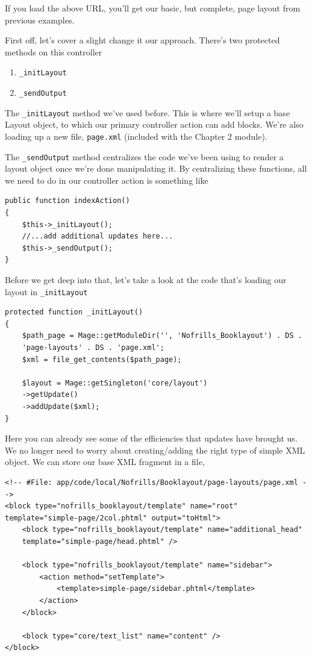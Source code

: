 \documentclass[oneside]{book}
\begin{document}
If you load the above URL, you'll get our basic, but complete, page layout from previous examples.

First off, let's cover a slight change it our approach. There's two protected methods on this controller

\begin{enumerate}
\item \footnotesize\texttt{\_initLayout} \normalsize
\item \footnotesize\texttt{\_sendOutput} \normalsize
\end{enumerate}


The \footnotesize\texttt{\_initLayout} \normalsize  method we've used before.  This is where we'll setup a base Layout object, to which our primary controller action can add blocks.  We're also loading up a new file, \footnotesize\texttt{page.xml} \normalsize  (included with the Chapter 2 module).

The \footnotesize\texttt{\_sendOutput} \normalsize  method centralizes the code we've been using to render a layout object once we're done manipulating it.  By centralizing these functions, all we need to do in our controller action is something like

\begin{lstlisting}
public function indexAction()
{
    $this->_initLayout();
    //...add additional updates here...
    $this->_sendOutput();
}

\end{lstlisting}


Before we get deep into that, let's take a look at the code that's loading our layout in \footnotesize\texttt{\_initLayout} \normalsize

\begin{lstlisting}
protected function _initLayout()
{
    $path_page = Mage::getModuleDir('', 'Nofrills_Booklayout') . DS .
    'page-layouts' . DS . 'page.xml';
    $xml = file_get_contents($path_page);

    $layout = Mage::getSingleton('core/layout')
    ->getUpdate()
    ->addUpdate($xml);
}

\end{lstlisting}


Here you can already see some of the efficiencies that updates have brought us.  We no longer need to worry about creating/adding the right type of simple XML object.  We can store our base XML fragment in a file,

\begin{lstlisting}
<!-- #File: app/code/local/Nofrills/Booklayout/page-layouts/page.xml -->
<block type="nofrills_booklayout/template" name="root"
template="simple-page/2col.phtml" output="toHtml">
    <block type="nofrills_booklayout/template" name="additional_head"
    template="simple-page/head.phtml" />

    <block type="nofrills_booklayout/template" name="sidebar">
        <action method="setTemplate">
            <template>simple-page/sidebar.phtml</template>
        </action>
    </block>

    <block type="core/text_list" name="content" />
</block>

\end{lstlisting}
\end{document}
